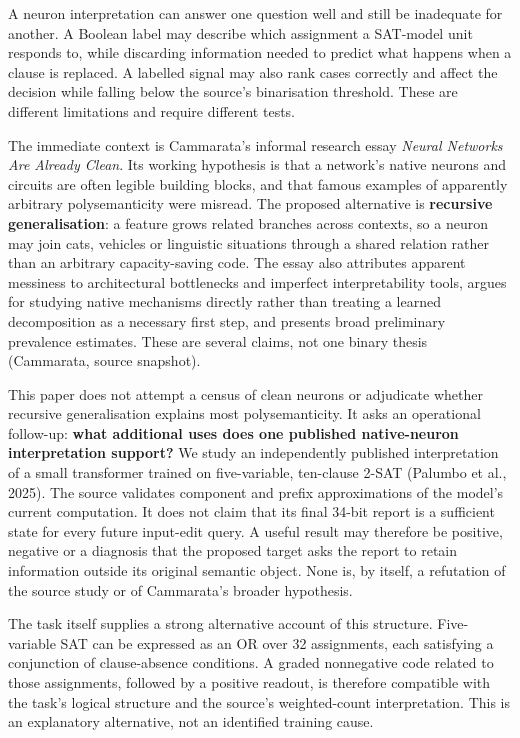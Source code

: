 \documentclass[
  british,
  11pt,
  a4paper,
]{article}
\begin{document}
A neuron interpretation can answer one question well and still be
inadequate for another. A Boolean label may describe which assignment a
SAT-model unit responds to, while discarding information needed to
predict what happens when a clause is replaced. A labelled signal may
also rank cases correctly and affect the decision while falling below
the source's binarisation threshold. These are different limitations and
require different tests.

The immediate context is Cammarata's informal research essay
\emph{Neural Networks Are Already Clean}. Its working hypothesis is that
a network's native neurons and circuits are often legible building
blocks, and that famous examples of apparently arbitrary polysemanticity
were misread. The proposed alternative is \textbf{recursive
generalisation}: a feature grows related branches across contexts, so a
neuron may join cats, vehicles or linguistic situations through a shared
relation rather than an arbitrary capacity-saving code. The essay also
attributes apparent messiness to architectural bottlenecks and imperfect
interpretability tools, argues for studying native mechanisms directly
rather than treating a learned decomposition as a necessary first step,
and presents broad preliminary prevalence estimates. These are several
claims, not one binary thesis (Cammarata, source snapshot).

This paper does not attempt a census of clean neurons or adjudicate
whether recursive generalisation explains most polysemanticity. It asks
an operational follow-up: \textbf{what additional uses does one
published native-neuron interpretation support?} We study an
independently published interpretation of a small transformer trained on
five-variable, ten-clause 2-SAT (Palumbo et al., 2025). The source
validates component and prefix approximations of the model's current
computation. It does not claim that its final 34-bit report is a
sufficient state for every future input-edit query. A useful result may
therefore be positive, negative or a diagnosis that the proposed target
asks the report to retain information outside its original semantic
object. None is, by itself, a refutation of the source study or of
Cammarata's broader hypothesis.

The task itself supplies a strong alternative account of this structure.
Five-variable SAT can be expressed as an OR over 32 assignments, each
satisfying a conjunction of clause-absence conditions. A graded
nonnegative code related to those assignments, followed by a positive
readout, is therefore compatible with the task's logical structure and
the source's weighted-count interpretation. This is an explanatory
alternative, not an identified training cause.
\end{document}
